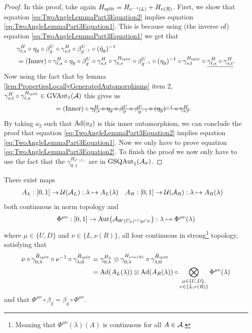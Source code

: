 \documentclass[11pt,a4paper,twoside]{article}
\numberwithin{equation}{section}
\begin{document}
	\begin{proof}
		In this proof, take again $\Hsplit=H_{\nu^{-1}(L)}+H_{\nu(R)}$. First, we show that equation \eqref{eq:TwoAngleLemmaPart3Equation2} implies equation \eqref{eq:TwoAngleLemmaPart3Equation1}. This is because using (the inverse of) equation \eqref{eq:TwoAngleLemmaPart3Equation1} we get that
		\begin{align}
			&\gamma^H_{t;s}\circ\eta_g\circ\beta_g^U\circ\gamma^H_{s;t}\circ\beta_{g^{-1}}^U\circ(\tilde{\eta}_g)^{-1}\\
			&=(\text{Inner})\circ \gamma^H_{t;s}\circ\eta_g\circ\beta_g^U\circ\gamma^H_{s;t}\circ\gamma^\Hsplit_{t;s}\circ\beta_{g^{-1}}^U\circ(\eta_g)^{-1}\circ\gamma^\Hsplit_{s;t}\circ\underline{\gamma^H_{t;s}\circ\gamma^H_{s;t}}.
		\end{align}
		Now using the fact that by lemma \ref{lem:PropertiesLocallyGeneratedAutomorphisms} item 2, $\gamma^H_{s;t}\circ\gamma^\Hsplit_{t;s}\in\textrm{GVAut}_1(\AA)$ this gives us
		\begin{align}
			&=(\text{Inner})\circ\stkout{\gamma^H_{t;s}\circ\eta_g\circ\beta_g^U\circ\beta_{g^{-1}}^U\circ(\eta_g)^{-1}\circ\gamma^H_{s;t}}.
		\end{align}
		By taking $a_2$ such that $\Ad{a_2}$ is this inner automorphism, we can conclude the proof that equation \eqref{eq:TwoAngleLemmaPart3Equation2} implies equation \eqref{eq:TwoAngleLemmaPart3Equation1}. Now we only have to prove equation \eqref{eq:TwoAngleLemmaPart3Equation2}. To finish the proof we now only have to use the fact that the $\gamma^{H_{\nu^{\sigma}(\sigma)}}_{0;1}$ are in $\textrm{GSQAut}_1(\AA_\sigma)$.
	\end{proof}
	\begin{lemma}\label{lem:SplittedAutomorphismAfterTranslatedIsVertical}
		There exist maps
		\begin{align}
			A_L&:[0,1]\rightarrow \UU(\AA_L):\lambda\mapsto A_{L}(\lambda)&A_R&:[0,1]\rightarrow \UU(\AA_R):\lambda\mapsto A_{R}(\lambda)
		\end{align}
		both continuous in norm topology and
		\begin{align}
			\Phi^{\mu\nu}:[0,1]\rightarrow\Aut{\AA_{W(C_\theta)^c\cap\mu\cap\nu}}:\lambda\mapsto \Phi^{\mu\nu}(\lambda)
		\end{align}
		where $\mu\in\{U,D\}$ and $\nu\in\{L,\nu(R)\}$, all four continuous in  strong\footnote{Meaning that $\Phi^{\mu\nu}(\lambda)(A)$ is continuous for all $A\in\AA$.} topology, satisfying that
		\begin{align}
			\nu\circ\gamma^{\HsplitTilde}_{0;\lambda}\circ\nu^{-1}\circ\gamma^{\HsplitTilde}_{\lambda;0}&=\gamma^{H_L}_{0;\lambda}\otimes\gamma^{H_{\nu\circ\nu(R)}}_{0;\lambda}\circ\gamma^{\HsplitTilde}_{\lambda;0}\\
			\label{eq:TranslatingSplittedTimeEvolutionAppendix}
			&=\Ad{A_L(\lambda)}\otimes\Ad{A_R(\lambda)}\circ\bigotimes_{\substack{\mu\in\{U,D\},\\\nu\in\{L,\nu(R)\}}}\Phi^{\mu\nu}(\lambda)
		\end{align}
		and that $\Phi^{\mu\nu}\circ\beta_g=\beta_g\circ\Phi^{\mu\nu}$.
	\end{lemma}
\end{document}

